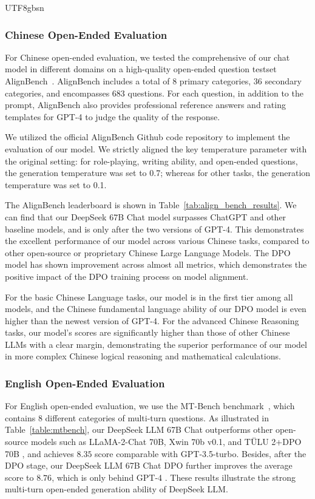 \documentclass[11pt, a4paper, logo, copyright, nonumbering]{deepseek}
\begin{document}
\begin{CJK*}{UTF8}{gbsn}
\subsubsection{Chinese Open-Ended Evaluation}
For Chinese open-ended evaluation, we tested the comprehensive of our chat model in different domains on a high-quality open-ended question testset AlignBench~\citep{align_bench}.
AlignBench includes a total of 8 primary categories,  36 secondary categories, and encompasses 683 questions. 
For each question, in addition to the prompt, AlignBench also provides professional reference answers and rating templates for GPT-4 to judge the quality of the response.

We utilized the official AlignBench Github code repository to implement the evaluation of our model. We strictly aligned the key temperature parameter with the original setting: for role-playing, writing ability, and open-ended questions, the generation temperature was set to 0.7; whereas for other tasks, the generation temperature was set to 0.1.

The AlignBench leaderboard is shown in Table~\ref{tab:align_bench_results}. We can find that our DeepSeek 67B Chat model surpasses ChatGPT and other baseline models, and is only after the two versions of GPT-4.
This demonstrates the excellent performance of our model across various Chinese tasks, compared to other open-source or proprietary Chinese Large Language Models. The DPO model has shown improvement across almost all metrics, which demonstrates the positive impact of the DPO training process on model alignment.

For the basic Chinese Language tasks, our model is in the first tier among all models, and the Chinese fundamental language ability of our DPO model is even higher than the newest version of GPT-4.
For the advanced Chinese Reasoning tasks, our model's scores are significantly higher than those of other Chinese LLMs with a clear margin, demonstrating the 
superior performance of our model in more complex Chinese logical reasoning and mathematical calculations.

\subsubsection{English Open-Ended Evaluation}
For English open-ended evaluation, we use the MT-Bench benchmark~\citep{mtbench}, which contains 8 different categories of multi-turn questions.
As illustrated in Table~\ref{table:mtbench}, our DeepSeek LLM 67B Chat outperforms other open-source models such as LLaMA-2-Chat \cite{llama2} 70B, Xwin 70b v0.1, and TÜLU 2+DPO 70B \citep{tulu2}, and achieves $8.35$ score comparable with GPT-3.5-turbo.
Besides, after the DPO stage, our DeepSeek LLM 67B Chat DPO further improves the average score to $8.76$, which is only behind GPT-4 \citep{gpt4}.
These results illustrate the strong multi-turn open-ended generation ability of DeepSeek LLM.


\end{CJK*}
\end{document}
